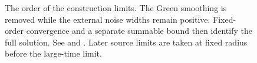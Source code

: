 \begin{figure}
  \centering
  
  \caption[The order of construction limits]{The order of the construction
    limits. The Green smoothing is removed while the external noise widths
    remain positive. Fixed-order convergence and a separate summable bound then
    identify the full solution. See  and
    . Later source limits are taken at
    fixed radius before the large-time limit.}
  \label{Fig:order-of-limits}
\end{figure}

